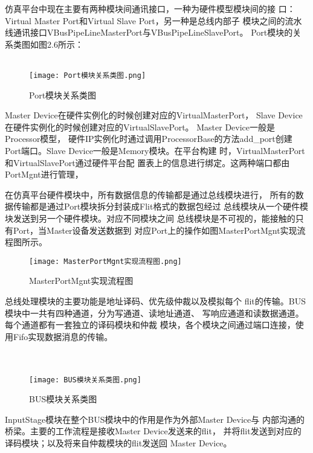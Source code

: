 仿真平台中现在主要有两种模块间通讯接口，一种为硬件模型模块间的接
口：Virtual Master Port和Virtual Slave Port，另一种是总线内部子
模块之间的流水线通讯接口VBusPipeLineMasterPort与VBusPipeLineSlavePort。
Port模块的关系类图如图2.6所示：
\\
\\

\begin{figure}
    \centering
    \texttt{[image: Port模块关系类图.png]}
    \caption{Port模块关系类图}
    \label{fig:badge}
\end{figure}

Master Device在硬件实例化的时候创建对应的VirtualMasterPort，
Slave Device在硬件实例化的时候创建对应的VirtualSlavePort。
Master Device一般是Processor模型，
硬件IP实例化时通过调用ProcessorBase的方法add\_port创建
Port端口。Slave Device一般是Memory模块。在平台构建
时，VirtualMasterPort和VirtualSlavePort通过硬件平台配
置表上的信息进行绑定。这两种端口都由PortMgnt进行管理，

在仿真平台硬件模块中，所有数据信息的传输都是通过总线模块进行，
所有的数据传输都是通过Port模块拆分封装成Flit格式的数据包经过
总线模块从一个硬件模块发送到另一个硬件模块。对应不同模块之间
总线模块是不可视的，能接触的只有Port，当Master设备发送数据到
对应Port上的操作如图MasterPortMgnt实现流程图所示。

\begin{figure}
  \centering
  \texttt{[image: MasterPortMgnt实现流程图.png]}
  \caption{MasterPortMgnt实现流程图}
  \label{fig:badge}
\end{figure}

总线处理模块的主要功能是地址译码、优先级仲裁以及模拟每个
flit的传输。BUS模块中一共有四种通道，分为写通道、读地址通道、
写响应通道和读数据通道。每个通道都有一套独立的译码模块和仲裁
模块，各个模块之间通过端口连接，使用Fifo实现数据消息的传输。
\\
\\
\\

\begin{figure}
    \centering
    \texttt{[image: BUS模块关系类图.png]}
    \caption{BUS模块关系类图}
    \label{fig:badge}
\end{figure}

InputStage模块在整个BUS模块中的作用是作为外部Master Device与
内部沟通的桥梁。主要的工作流程是接收Master Device发送来的flit，
并将flit发送到对应的译码模块；以及将来自仲裁模块的flit发送回
Master Device。

